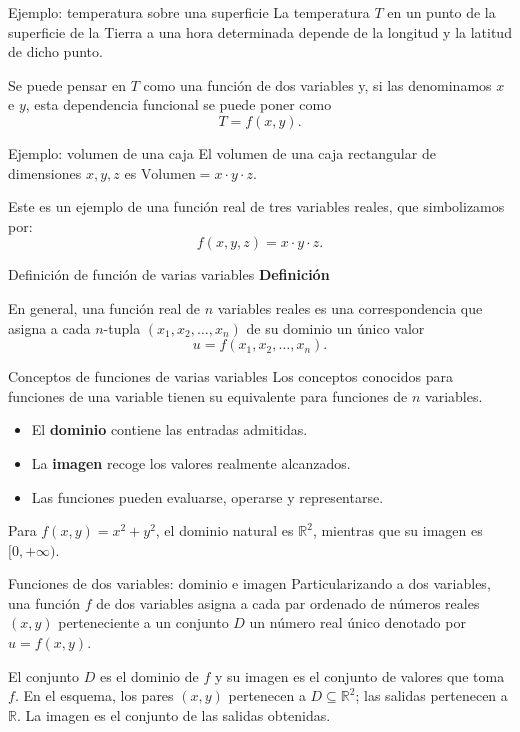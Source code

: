 \documentclass[main.tex]{subfiles}
\begin{document}
\begin{frame}{Ejemplo: temperatura sobre una superficie}
La temperatura $T$ en un punto de la superficie de la Tierra a una hora determinada depende de la longitud y la latitud de dicho punto.
\medskip

Se puede pensar en $T$ como una función de dos variables y, si las denominamos $x$ e $y$, esta dependencia funcional se puede poner como
\[T=f(x,y).\]
\end{frame}
\begin{frame}{Ejemplo: volumen de una caja}
El volumen de una caja rectangular de dimensiones $x,y,z$ es $\text{Volumen}=x\cdot y\cdot z$.
\medskip

Este es un ejemplo de una función real de tres variables reales, que simbolizamos por:
\[f(x,y,z)=x\cdot y\cdot z.\]
\end{frame}
\begin{frame}{Definición de función de varias variables}
\textbf{Definición}
\medskip

En general, una función real de $n$ variables reales es una correspondencia que asigna a cada $n$-tupla $(x_1,x_2,\ldots,x_n)$ de su dominio un único valor
\[u=f(x_1,x_2,\ldots,x_n).\]
\end{frame}
\begin{frame}{Conceptos de funciones de varias variables}
Los conceptos conocidos para funciones de una variable tienen su equivalente para funciones de $n$ variables.
\medskip
\begin{itemize}
\item El \textbf{dominio} contiene las entradas admitidas.
\item La \textbf{imagen} recoge los valores realmente alcanzados.
\item Las funciones pueden evaluarse, operarse y representarse.
\end{itemize}
\medskip
Para $f(x,y)=x^2+y^2$, el dominio natural es $\mathbb R^2$,
mientras que su imagen es $[0,+\infty)$.
\end{frame}
\begin{frame}{Funciones de dos variables: dominio e imagen}
Particularizando a dos variables, una función $f$ de dos variables asigna a cada par ordenado de números reales $(x,y)$ perteneciente a un conjunto $D$ un número real único denotado por $u=f(x,y)$.
\medskip

El conjunto $D$ es el dominio de $f$ y su imagen es el conjunto de valores que toma $f$.
\vspace{-2mm}
{\footnotesize En el esquema, los pares $(x,y)$ pertenecen a
$D\subseteq\mathbb R^2$; las salidas pertenecen a $\mathbb R$.
La imagen es el conjunto de las salidas obtenidas.}
\end{frame}
\end{document}
